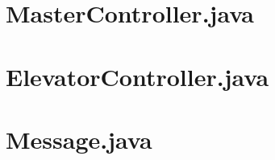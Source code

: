 \section{MasterController.java}
\label{code:master}


\section{ElevatorController.java}
\label{code:controller}


\section{Message.java}
\label{code:message}

